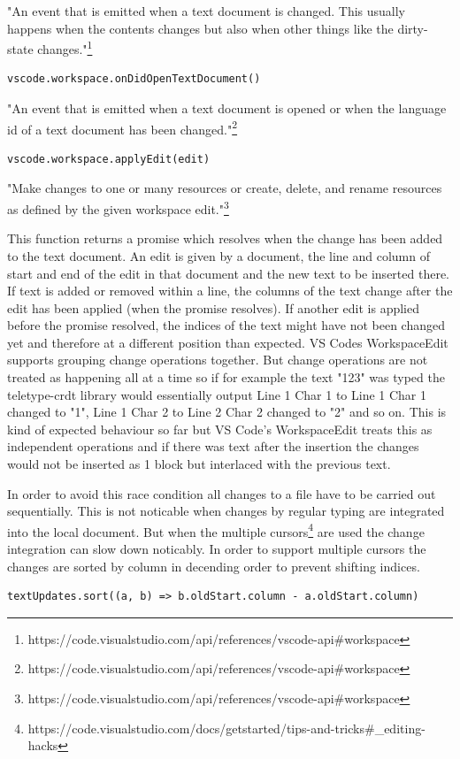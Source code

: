 "An event that is emitted when a text document is changed. This usually happens when the contents changes but also when other things like the dirty-state changes."\footnote{https://code.visualstudio.com/api/references/vscode-api\#workspace}

\begin{lstlisting}
vscode.workspace.onDidOpenTextDocument()
\end{lstlisting}

"An event that is emitted when a text document is opened or when the language id of a text document has been changed."\footnote{https://code.visualstudio.com/api/references/vscode-api\#workspace}

\begin{lstlisting}
vscode.workspace.applyEdit(edit)
\end{lstlisting}
"Make changes to one or many resources or create, delete, and rename resources as defined by the given workspace edit."\footnote{https://code.visualstudio.com/api/references/vscode-api\#workspace}

This function returns a promise which resolves when the change has been added to the text document.
An edit is given by a document, the line and column of start and end of the edit in that document and the new text to be inserted there.
If text is added or removed within a line, the columns of the text change after the edit has been applied (when the promise resolves). If another edit is applied before the promise resolved, the indices of the text might have not been changed yet and therefore at a different position than expected. VS Codes WorkspaceEdit supports grouping change operations together. But change operations are not treated as happening all at a time so if for example the text "123" was typed the teletype-crdt library would essentially output Line 1 Char 1 to Line 1 Char 1 changed to "1", Line 1 Char 2 to Line 2 Char 2 changed to "2" and so on. This is kind of expected behaviour so far but VS Code's WorkspaceEdit treats this as independent operations and if there was text after the insertion the changes would not be inserted as 1 block but interlaced with the previous text. 

In order to avoid this race condition all changes to a file have to be carried out sequentially. This is not noticable when changes by regular typing are integrated into the local document. But when the multiple cursors\footnote{https://code.visualstudio.com/docs/getstarted/tips-and-tricks\#\_editing-hacks} are used the change integration can slow down noticably. In order to support multiple cursors the changes are sorted by column in decending order to prevent shifting indices. 
\begin{lstlisting}
textUpdates.sort((a, b) => b.oldStart.column - a.oldStart.column)
\end{lstlisting}

